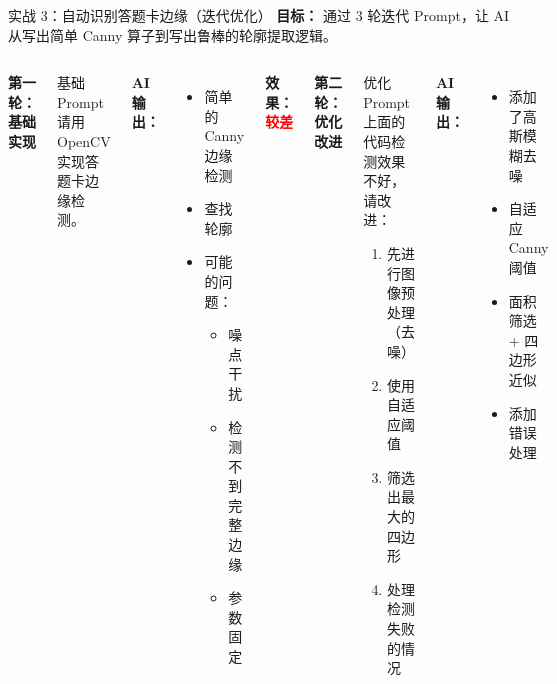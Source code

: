 \begin{frame}{实战 3：自动识别答题卡边缘（迭代优化）}
	\textbf{目标：} 通过 3 轮迭代 Prompt，让 AI 从写出简单 Canny 算子到写出鲁棒的轮廓提取逻辑。

	\vspace{0.3cm}

	\begin{columns}
		\textbf{第一轮：基础实现}

		\begin{alertblock}{基础 Prompt}
			\small
			请用 OpenCV 实现答题卡边缘检测。
		\end{alertblock}

		\vspace{0.2cm}

		\textbf{AI 输出：}
		\begin{itemize}
			\item 简单的 Canny 边缘检测
			\item 查找轮廓
			\item 可能的问题：
			      \begin{itemize}
				      \item 噪点干扰
				      \item 检测不到完整边缘
				      \item 参数固定
			      \end{itemize}
		\end{itemize}

		\textbf{效果：}\textcolor{red}{\textbf{较差}}

		\textbf{第二轮：优化改进}

		\begin{exampleblock}{优化 Prompt}
			\small
			上面的代码检测效果不好，请改进：
			\begin{enumerate}
				\item 先进行图像预处理（去噪）
				\item 使用自适应阈值
				\item 筛选出最大的四边形
				\item 处理检测失败的情况
			\end{enumerate}
		\end{exampleblock}

		\vspace{0.2cm}

		\textbf{AI 输出：}
		\begin{itemize}
			\item 添加了高斯模糊去噪
			\item 自适应 Canny 阈值
			\item 面积筛选 + 四边形近似
			\item 添加错误处理
		\end{itemize}


\end{columns}
\end{frame}
